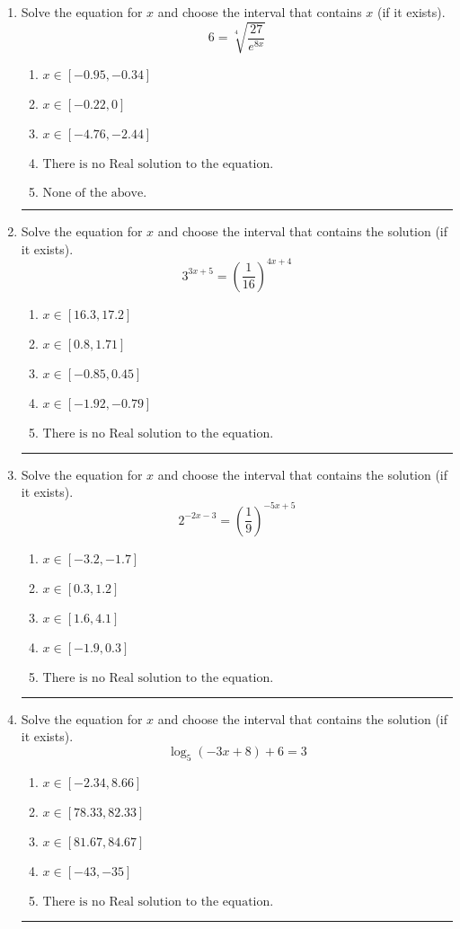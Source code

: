 \documentclass[14pt]{extbook}
\newcommand{\litem}[1]{\item#1\hspace*{-1cm}\rule{\textwidth}{0.4pt}}
\begin{document}
\begin{enumerate}
\litem{
 Solve the equation for $x$ and choose the interval that contains $x$ (if it exists).\[  6 = \sqrt[4]{\frac{27}{e^{8x}}} \]\begin{enumerate}[label=\Alph*.]
\item \( x \in [-0.95, -0.34] \)
\item \( x \in [-0.22, 0] \)
\item \( x \in [-4.76, -2.44] \)
\item \( \text{There is no Real solution to the equation.} \)
\item \( \text{None of the above.} \)

\end{enumerate} }
\litem{
Solve the equation for $x$ and choose the interval that contains the solution (if it exists).\[ 3^{3x+5} = \left(\frac{1}{16}\right)^{4x+4} \]\begin{enumerate}[label=\Alph*.]
\item \( x \in [16.3, 17.2] \)
\item \( x \in [0.8, 1.71] \)
\item \( x \in [-0.85, 0.45] \)
\item \( x \in [-1.92, -0.79] \)
\item \( \text{There is no Real solution to the equation.} \)

\end{enumerate} }
\litem{
Solve the equation for $x$ and choose the interval that contains the solution (if it exists).\[ 2^{-2x-3} = \left(\frac{1}{9}\right)^{-5x+5} \]\begin{enumerate}[label=\Alph*.]
\item \( x \in [-3.2, -1.7] \)
\item \( x \in [0.3, 1.2] \)
\item \( x \in [1.6, 4.1] \)
\item \( x \in [-1.9, 0.3] \)
\item \( \text{There is no Real solution to the equation.} \)

\end{enumerate} }
\litem{
Solve the equation for $x$ and choose the interval that contains the solution (if it exists).\[ \log_{5}{(-3x+8)}+6 = 3 \]\begin{enumerate}[label=\Alph*.]
\item \( x \in [-2.34, 8.66] \)
\item \( x \in [78.33, 82.33] \)
\item \( x \in [81.67, 84.67] \)
\item \( x \in [-43, -35] \)
\item \( \text{There is no Real solution to the equation.} \)


\end{enumerate}}
\end{enumerate}
\end{document}
